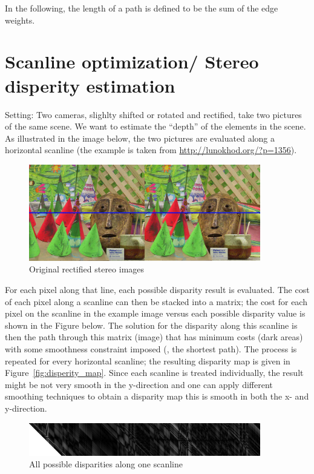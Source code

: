 In the following, the length of a path is defined to be the sum of the
edge weights.


\section{Scanline optimization/ Stereo disperity estimation}
Setting: Two cameras, slighlty shifted or rotated and rectified, take
two pictures of the same scene. We want to estimate the ``depth'' of
the elements in the scene. As illustrated in the image below, the two
pictures are evaluated along a horizontal scanline (the example is
taken from \url{http://lunokhod.org/?p=1356}).

\begin{figure}[h!]
  \centering
  \includegraphics[width=0.9\textwidth]{Figures/input_imagery_and_scanline}
  \caption{Original rectified stereo images}
\end{figure}
For each pixel along that line, each possible disparity result is
evaluated. The cost of each pixel along a scanline can then be stacked
into a matrix; the cost for each pixel on the scanline in the example
image versus each possible disparity value is shown in the Figure
below. The solution for the disparity along this scanline is then the
path through this matrix (image) that has minimum costs (dark areas)
with some smoothness constraint imposed (\ie, the shortest path). The
process is repeated for every horizontal scanline; the resulting
disparity map is given in Figure~\ref{fig:disperity_map}. Since each
scanline is treated individually, the result might be not very smooth
in the y-direction and one can apply different smoothing techniques to
obtain a disparity map this is smooth in both the x- and y-direction.

\begin{figure}[h!]
  \centering
  \includegraphics[width=0.9\textwidth]{Figures/scanline_costs}
  \caption{All possible disparities along one scanline}
\end{figure}     


